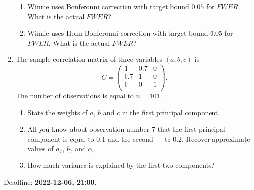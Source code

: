 \documentclass[12pt]{article}
\begin{document}
\begin{enumerate}
  \begin{enumerate}
    \item Winnie uses Bonferonni correction with target bound $0.05$ for $FWER$. 
    What is the actual $FWER$?
    \item Winnie uses Holm-Bonferonni correction with target bound $0.05$ for $FWER$. 
    What is the actual $FWER$?
  \end{enumerate}
  \item The sample correlation matrix of three variables $(a, b, c)$ is 
  \[
C = \begin{pmatrix}
  1 & 0.7 & 0  \\
  0.7 & 1 & 0 \\
  0 & 0 & 1 \\
\end{pmatrix}.
  \]
  The number of observations is equal to $n=101$.

  \begin{enumerate}
    \item State the weights of $a$, $b$ and $c$ in the first principal component. 
    \item All you know about observation number 7 that the first principal component is equal to $0.1$ and the second — to $0.2$.
    Recover approximate values of $a_7$, $b_7$ and $c_7$.
    \item How much variance is explained by the first two components?
  \end{enumerate}


\end{enumerate}

Deadline: \textbf{2022-12-06, 21:00}. 
\end{document}
